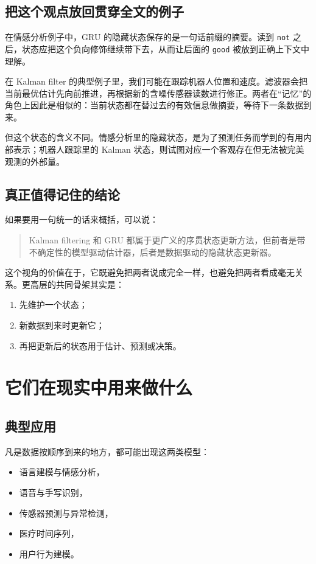 \documentclass[12pt,a4paper]{ctexart}
\begin{document}
\subsection{把这个观点放回贯穿全文的例子}

在情感分析例子中，GRU 的隐藏状态保存的是一句话前缀的摘要。读到 \texttt{not} 之后，状态应把这个负向修饰继续带下去，从而让后面的 \texttt{good} 被放到正确上下文中理解。

在 Kalman filter 的典型例子里，我们可能在跟踪机器人位置和速度。滤波器会把当前最优估计先向前推进，再根据新的含噪传感器读数进行修正。两者在“记忆”的角色上因此是相似的：当前状态都在替过去的有效信息做摘要，等待下一条数据到来。

但这个状态的含义不同。情感分析里的隐藏状态，是为了预测任务而学到的有用内部表示；机器人跟踪里的 Kalman 状态，则试图对应一个客观存在但无法被完美观测的外部量。

\subsection{真正值得记住的结论}

如果要用一句统一的话来概括，可以说：
\begin{quote}
Kalman filtering 和 GRU 都属于更广义的序贯状态更新方法，但前者是带不确定性的模型驱动估计器，后者是数据驱动的隐藏状态更新器。
\end{quote}

这个视角的价值在于，它既避免把两者说成完全一样，也避免把两者看成毫无关系。更高层的共同骨架其实是：
\begin{enumerate}
  \item 先维护一个状态；
  \item 新数据到来时更新它；
  \item 再把更新后的状态用于估计、预测或决策。
\end{enumerate}

\section{它们在现实中用来做什么}

\subsection{典型应用}

凡是数据按顺序到来的地方，都可能出现这两类模型：
\begin{itemize}
  \item 语言建模与情感分析，
  \item 语音与手写识别，
  \item 传感器预测与异常检测，
  \item 医疗时间序列，
  \item 用户行为建模。
\end{itemize}
\end{document}
